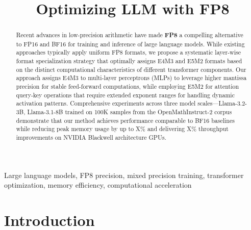 \documentclass[conference]{IEEEtran}
\begin{document}
\title{Optimizing LLM with FP8}

\author{
\and
{}
}

\maketitle

\begin{abstract}
Recent advances in low-precision arithmetic have made \textbf{FP8} \cite{micikevicius2022fp8formatsdeeplearning} a compelling alternative to FP16 and BF16 for training and inference of large language models. While existing approaches typically apply uniform FP8 formats, we propose a systematic layer-wise format specialization strategy that optimally assigns E4M3 and E5M2 formats based on the distinct computational characteristics of different transformer components. Our approach assigns E4M3 to multi-layer perceptrons (MLPs) to leverage higher mantissa precision for stable feed-forward computations, while employing E5M2 for attention query-key operations that require extended exponent ranges for handling dynamic activation patterns. Comprehensive experiments across three model scales—Llama-3.2-3B, Llama-3.1-8B trained on 100K samples from the OpenMathInstruct-2 corpus demonstrate that our method achieves performance comparable to BF16 baselines while reducing peak memory usage by up to X\% and delivering X\% throughput improvements on NVIDIA Blackwell architecture GPUs.
\end{abstract}

\begin{IEEEkeywords}
Large language models, FP8 precision, mixed precision training, transformer optimization, memory efficiency, computational acceleration
\end{IEEEkeywords}

\section{Introduction}
\end{document}
